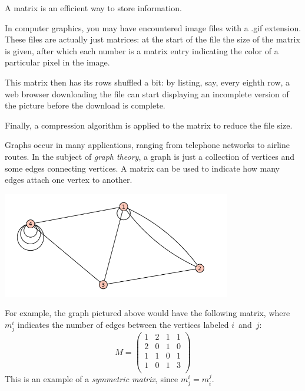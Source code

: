 A matrix is  an efficient way to store information.

\begin{example}
In computer graphics, you may have encountered image files with a .gif extension.  These files are actually just matrices: at the start of the file the size of the matrix is given, after which each number is a matrix entry  indicating the color of a particular pixel in the image.

This matrix  then has its rows shuffled a bit: by listing, say, every eighth row, a web browser downloading the file can start displaying an incomplete version of the picture before the download is complete.

Finally, a compression algorithm is applied to the matrix to reduce the file size.
\end{example}



\begin{example}
Graphs occur in many applications, ranging from telephone networks to airline routes.  In the subject of \emph{graph theory}, a graph is just a collection of vertices and some edges connecting vertices.  A matrix can be used to indicate how many edges attach one vertex to another.

\begin{center}
\includegraphics[width=10cm]{notes8-0.png}
\end{center}
For example, the graph pictured above would have the following matrix, where $m^i_j$ indicates the number of edges between the vertices labeled $i$~and~$j$:
\[
M = \begin{pmatrix}
1 & 2 & 1 & 1 \\
2 & 0 & 1 & 0 \\
1 & 1 & 0 & 1 \\
1 & 0 & 1 & 3 \\
\end{pmatrix}
\]
This is an example of a \emph{symmetric matrix}, since $m_j^i = m_i^j$.

\end{example}

